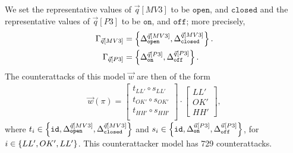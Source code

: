 {We set the representative values of $\vec{q}[MV3]$ to be $\texttt{open}$, and $\texttt{closed}$ and the representative values of $\vec{q}[P3]$ to be $\texttt{on}$, and $\texttt{off}$; more precisely, 
\begin{align*}
  \Gamma_{\vec{q}[MV3]}&=\left\{{\Delta}^{\vec{q}[MV3]}_{\texttt{open}}, {\Delta}^{\vec{q}[MV3]}_{\texttt{closed}}\right\}.\\
  \Gamma_{\vec{q}[P3]}&=\left\{{\Delta}^{\vec{q}[P3]}_{\texttt{on}}, {\Delta}^{\vec{q}[P3]}_{\texttt{off}}\right\}.
\end{align*}
The counterattacks of this model $\vec{w}$ are then of the form
\begin{align*}
  \vec{w}(\pi)=
  \begin{bmatrix}
    t_{LL'}\circ s_{LL'} \\
    t_{OK'}\circ s_{OK'} \\
    t_{HH'}\circ s_{HH'} \\
  \end{bmatrix}
  \cdot
  \begin{bmatrix}
    LL' \\
    OK' \\
    HH'
  \end{bmatrix},
\end{align*} 
where $t_i\in \left\{{\texttt{id}},{\Delta}^{\vec{q}[MV3]}_{\texttt{open}}, {\Delta}^{\vec{q}[MV3]}_{\texttt{closed}}\right\}$ and  $s_i\in\left\{{\texttt{id}},{\Delta}^{\vec{u}[P3]}_{\texttt{on}}, {\Delta}^{\vec{u}[P3]}_{\texttt{off}}\right\}$, for $i\in \left\{LL',OK',LL'\right\}$. This counterattacker model has 729 counterattacks.



}
